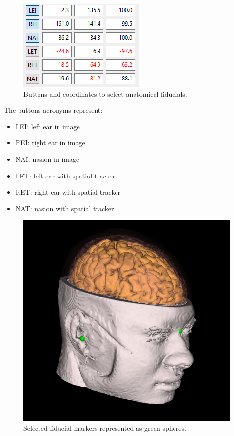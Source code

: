 \begin{figure}[!htb]
\centering
\includegraphics[scale=0.5]{../user_guide_figures/invesalius_screen/nav_selec_coord_en.png}
\caption{Buttons and coordinates to select anatomical fiducials.}
\label{fig:nav_selec_coord}
\end{figure}

The buttons acronyms represent:

\begin{itemize}
	\item LEI: left ear in image
	\item REI: right ear in image
	\item NAI: nasion in image
	\item LET: left ear with spatial tracker
	\item RET: right ear with spatial tracker
	\item NAT: nasion with spatial tracker
\end{itemize}

\begin{figure}[!htb]
\centering
\includegraphics[scale=0.5]{../user_guide_figures/invesalius_screen/nav_balls_in_head.png}
\caption{Selected fiducial markers represented as green spheres.}
\label{fig:nav_balls_in_head}
\end{figure}


